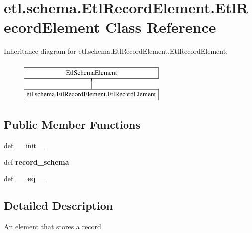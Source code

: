 \hypertarget{classetl_1_1schema_1_1EtlRecordElement_1_1EtlRecordElement}{\section{etl.\-schema.\-Etl\-Record\-Element.\-Etl\-Record\-Element Class Reference}
\label{classetl_1_1schema_1_1EtlRecordElement_1_1EtlRecordElement}
}
Inheritance diagram for etl.\-schema.\-Etl\-Record\-Element.\-Etl\-Record\-Element\-:\begin{figure}[H]
\begin{center}
\leavevmode
\includegraphics[height=2.000000cm]{classetl_1_1schema_1_1EtlRecordElement_1_1EtlRecordElement}
\end{center}
\end{figure}
\subsection*{Public Member Functions}
\begin{DoxyCompactItemize}
\item 
def \hyperlink{classetl_1_1schema_1_1EtlRecordElement_1_1EtlRecordElement_a976867350ebe6053980d47778c4cc8bb}{\-\_\-\-\_\-init\-\_\-\-\_\-}
\item 
\hypertarget{classetl_1_1schema_1_1EtlRecordElement_1_1EtlRecordElement_a849503de3f5681b4bc83faabeb4a1cb8}{def {\bfseries record\-\_\-schema}}\label{classetl_1_1schema_1_1EtlRecordElement_1_1EtlRecordElement_a849503de3f5681b4bc83faabeb4a1cb8}

\item 
\hypertarget{classetl_1_1schema_1_1EtlRecordElement_1_1EtlRecordElement_afed59b153c5627c20e7a12c36feb8a41}{def {\bfseries \-\_\-\-\_\-eq\-\_\-\-\_\-}}\label{classetl_1_1schema_1_1EtlRecordElement_1_1EtlRecordElement_afed59b153c5627c20e7a12c36feb8a41}

\end{DoxyCompactItemize}


\subsection{Detailed Description}
\begin{DoxyVerb}An element that stores a record\end{DoxyVerb}
 

